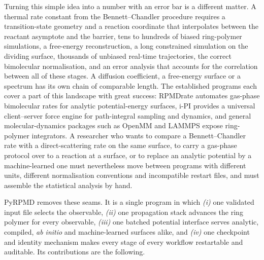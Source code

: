 \documentclass[preprint,12pt]{elsarticle}
\begin{document}
Turning this simple idea into a number with an error bar is a different matter. A thermal rate constant from the Bennett--Chandler procedure \cite{bennett1977,chandler1978,bimol09} requires a transition-state geometry and a reaction coordinate that interpolates between the reactant asymptote and the barrier, tens to hundreds of biased ring-polymer simulations, a free-energy reconstruction, a long constrained simulation on the dividing surface, thousands of unbiased real-time trajectories, the correct bimolecular normalisation, and an error analysis that accounts for the correlation between all of these stages. A diffusion coefficient, a free-energy surface or a spectrum has its own chain of comparable length. The established programs each cover a part of this landscape with great success: RPMDrate \cite{rpmrate13} automates gas-phase bimolecular rates for analytic potential-energy surfaces, i-PI \cite{ipi2014,ipi2019} provides a universal client--server force engine for path-integral sampling and dynamics, and general molecular-dynamics packages such as OpenMM \cite{openmm2017} and LAMMPS \cite{lammps1995} expose ring-polymer integrators. A researcher who wants to compare a Bennett--Chandler rate with a direct-scattering rate on the same surface, to carry a gas-phase protocol over to a reaction at a surface, or to replace an analytic potential by a machine-learned one must nevertheless move between programs with different units, different normalisation conventions and incompatible restart files, and must assemble the statistical analysis by hand.

PyRPMD removes these seams. It is a single program in which \emph{(i)} one validated input file selects the observable, \emph{(ii)} one propagation stack advances the ring polymer for every observable, \emph{(iii)} one batched potential interface serves analytic, compiled, \emph{ab initio} and machine-learned surfaces alike, and \emph{(iv)} one checkpoint and identity mechanism makes every stage of every workflow restartable and auditable. Its contributions are the following.
\end{document}
